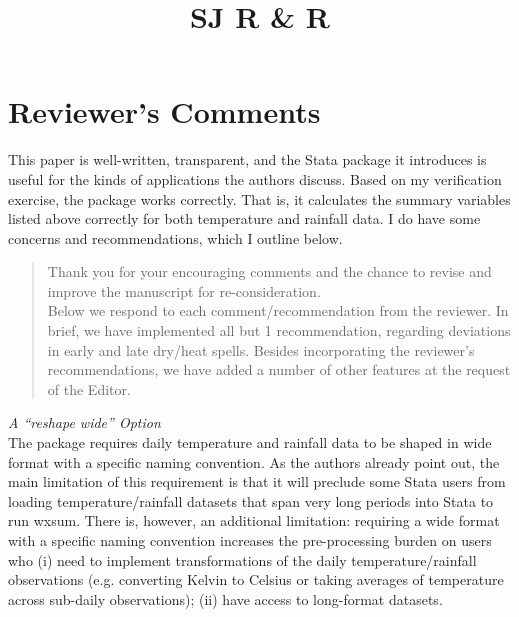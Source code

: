 \documentclass{article}[11pt]
\title{SJ R \& R}
\author{}
\date{}
\begin{document}
\setlength{\parindent}{0pt} %
\setlength{\parskip}{\smallskipamount}

\pagestyle{fancy}
\fancyhead{} %
\renewcommand{\thetable}{E-\arabic{table}}
\renewcommand{\thefigure}{E-\arabic{figure}}

\onehalfspacing
\section*{Reviewer's Comments}

This paper is well-written, transparent, and the Stata package it introduces is useful for the kinds of applications the authors discuss. Based on my verification exercise, the package works correctly. That is, it calculates the summary variables listed above correctly for both temperature and rainfall data. I do have some concerns and recommendations, which I outline below.
    \begin{quote}
        Thank you for your encouraging comments and the chance to revise and improve the manuscript for re-consideration. \\ 
        
        Below we respond to each comment/recommendation from the reviewer. In brief, we have implemented all but 1 recommendation, regarding deviations in early and late dry/heat spells. Besides incorporating the reviewer's recommendations, we have added a number of other features at the request of the Editor. 
    \end{quote}
    
\emph{A “reshape wide” Option} \\
The package requires daily temperature and rainfall data to be shaped in wide format with a specific naming convention. As the authors already point out, the main limitation of this requirement is that it will preclude some Stata users from loading temperature/rainfall datasets that span very long periods into Stata to run wxsum. There is, however, an additional limitation: requiring a wide format with a specific naming convention increases the pre-processing burden on users who (i) need to implement transformations of the daily temperature/rainfall observations (e.g. converting Kelvin to Celsius or taking averages of temperature across sub-daily observations); (ii) have access to long-format datasets.
\end{document}
